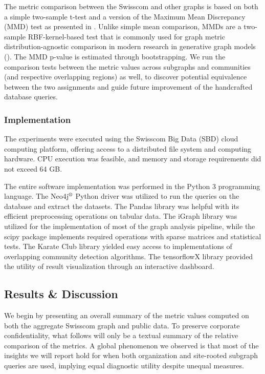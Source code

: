 The metric comparison between the Swisscom and other graphs is based on both a simple two-sample t-test and a version of the Maximum Mean Discrepancy (MMD) test as presented in \cite{gretton_kernel_2012}. Unlike simple mean comparison, MMDs are a two-sample RBF-kernel-based test that is commonly used for graph metric distribution-agnostic comparison in modern research in generative graph models (\cite{you_graphrnn_2018, krawczuk_gg-gan_2020}). The MMD p-value is estimated through bootstrapping. We run the comparison tests between the metric values across subgraphs and communities (and respective overlapping regions) as well, to discover potential equivalence between the two assignments and guide future improvement of the handcrafted database queries.


\subsubsection{Implementation}
The experiments were executed using the Swisscom Big Data (SBD) cloud computing platform, offering access to a distributed file system and computing hardware. CPU execution was feasible, and memory and storage requirements did not exceed 64 GB.

The entire software implementation was performed in the Python 3 programming language. The Neo4j$\textsuperscript{\textregistered}$ Python driver \cite{neo4j_inc_neo4j_2022} was utilized to run the queries on the database and extract the datasets. The Pandas library \cite{mckinney_data_2010} was helpful with its efficient preprocessing operations on tabular data. The iGraph library \cite{csardi_igraph_2005} was utilized for the implementation of most of the graph analysis pipeline, while the scipy package \cite{virtanen_scipy_2020} implements required operations with sparse matrices and statistical tests. The Karate Club library \cite{rozemberczki_karate_2020} yielded easy access to implementations of overlapping community detection algorithms. The tensorflowX library \cite{huang_tensorboardx_2022} provided the utility of result visualization through an interactive dashboard.

\subsection{Results \& Discussion}
\label{sec:results_swisscom}

We begin by presenting an overall summary of the metric values computed on both the aggregate Swisscom graph and public data. To preserve corporate confidentiality, what follows will only be a textual summary of the relative comparison of the metrics. A global phenomenon we observed is that most of the insights we will report hold for when both organization and site-rooted subgraph queries are used, implying equal diagnostic utility despite unequal measures. 


